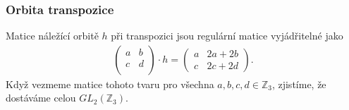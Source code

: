 \documentclass{scrartcl}
\begin{document}
    \subsubsection*{Orbita transpozice}
    Matice náležící orbitě $h$ při transpozici jsou regulární matice vyjádřitelné jako 
    \begin{align*}
        \begin{pmatrix}
            a & b \\
            c & d \\
        \end{pmatrix} 
        \cdot h =
        \begin{pmatrix}
            a & 2a+2b \\
            c & 2c+2d
        \end{pmatrix}.
    \end{align*}
    Když vezmeme matice tohoto tvaru pro všechna $a,b,c,d \in \mathbb{Z}_3$, zjistíme, že dostáváme celou $GL_2(\mathbb{Z}_3)$.
\end{document}
